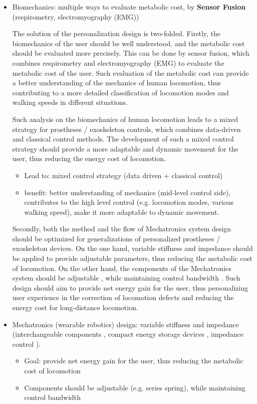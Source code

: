 \documentclass{article}
\begin{document}
\begin{itemize}
    
    \item Biomechanics: multiple ways to evaluate metabolic cost, by \textbf{Sensor Fusion} (respirometry, electromyography (EMG))
    
    The solution of the personalization design is two-folded. Firstly, the biomechanics of the user should be well understood, and the metabolic cost should be evaluated more precisely. This can be done by sensor fusion, which combines respirometry and electromyography (EMG) to evaluate the metabolic cost of the user. Such evaluation of the metabolic cost can provide a better understanding of the mechanics of human locomotion, thus contributing to a more detailed classification of locomotion modes and walking speeds in different situations.

    Such analysis on the biomechanics of human locomotion leads to a mixed strategy for prostheses / exoskeleton controls, which combines data-driven and classical control methods. The development of such a mixed control strategy should provide a more adaptable and dynamic movement for the user, thus reducing the energy cost of locomotion.
    
    \begin{itemize}
        \item Lead to: mixed control strategy (data driven + classical control)
        \item benefit: better understanding of mechanics (mid-level control side), contributes to the high level control (e.g. locomotion modes, various walking speed), make it more adaptable to dynamic movement.    
    \end{itemize}

    Secondly, both the method and the flow of Mechatronics system design should be optimized for generalizations of personalized prostheses / exoskeleton devices. On the one hand, variable stiffness and impedance should be applied to provide adjustable parameters, thus reducing the metabolic cost of locomotion. On the other hand, the components of the Mechatronics system should be adjustable \cite{OSLSpring} \cite{VariableMecheSys}, while maintaining control bandwidth \cite{SEABandwidth}. Such design should aim to provide net energy gain for the user, thus personalizing user experience in the correction of locomotion defects and reducing the energy cost for long-distance locomotion.

    \item Mechatronics (wearable robotics) design: variable stiffness and impedance (interchangeable components \cite{ProsthesisOverview}, compact energy storage devices \cite{OSLSpring}, impedance control \cite{VariableMecheSys}). 
    \begin{itemize}
        \item Goal: provide net energy gain for the user, thus reducing the metabolic cost of locomotion
        \item Components should be adjustable (e.g. series spring), while maintaining control bandwidth \cite{SEABandwidth}
    \end{itemize}
\end{itemize}
\end{document}
